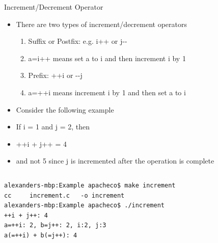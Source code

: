 \documentclass[10pt,t]{beamer}
\begin{document}
\begin{frame}[fragile]{Increment/Decrement Operator}
  \begin{itemize}
    \item There are two types of increment/decrement operators
    \begin{enumerate}
      \item Suffix or Postfix: e.g. i++ or j{-}{-}
      \item[] a=i++ means set a to i and then increment i by 1
      \item Prefix: ++i or {-}{-}j
      \item[] a=++i means increment i by 1 and then set a to i
    \end{enumerate}
    \item Consider the following example
    \item[] If i = 1 and j = 2, then
    \item[] ++i + j++ = 4
    \item[] and not 5 since j is incremented after the operation is complete
  \end{itemize}
  \begin{columns}
    
    \begin{lstlisting}[style=LINUX]
alexanders-mbp:Example apacheco$ make increment
cc     increment.c   -o increment
alexanders-mbp:Example apacheco$ ./increment
++i + j++: 4
a=++i: 2, b=j++: 2, i:2, j:3
a(=++i) + b(=j++): 4
    \end{lstlisting}
  \end{columns}
\end{frame}
\end{document}
